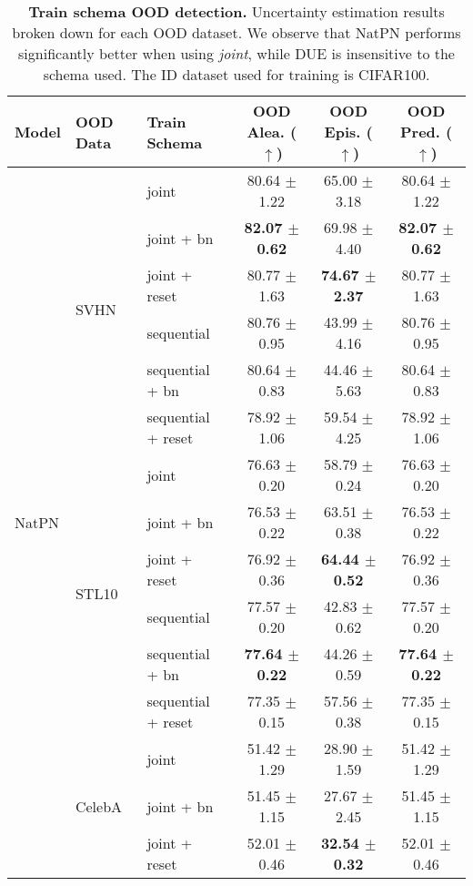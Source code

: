 \begin{table}[!htb]\centering
\caption{\textbf{Train schema OOD detection.} Uncertainty estimation results broken down for each OOD dataset. We observe that NatPN performs significantly better when using \textit{joint}, while DUE is insensitive to the schema used. The ID dataset used for training is CIFAR100.}
\label{tab:training_schema_ood}
\tiny

\begin{tabular}{lllccc}
\toprule
\textbf{Model} &\textbf{OOD Data} &\textbf{Train Schema} &\textbf{OOD Alea. ($\uparrow$)} &\textbf{OOD Epis. ($\uparrow$)} &\textbf{OOD Pred. ($\uparrow$)} \\
\midrule
\multirow{30}{*}{NatPN} &\multirow{6}{*}{SVHN} &joint &80.64 $\pm$ 1.22 &65.00 $\pm$ 3.18 &80.64 $\pm$ 1.22 \\
& &joint + bn &\textbf{82.07 $\pm$ 0.62} &69.98 $\pm$ 4.40 &\textbf{82.07 $\pm$ 0.62} \\
& &joint + reset &80.77 $\pm$ 1.63 &\textbf{74.67 $\pm$ 2.37} &80.77 $\pm$ 1.63 \\
& &sequential &80.76 $\pm$ 0.95 &43.99 $\pm$ 4.16 &80.76 $\pm$ 0.95 \\
& &sequential + bn &80.64 $\pm$ 0.83 &44.46 $\pm$ 5.63 &80.64 $\pm$ 0.83 \\
& &sequential + reset &78.92 $\pm$ 1.06 &59.54 $\pm$ 4.25 &78.92 $\pm$ 1.06 \\
\cmidrule[0.1pt](lr){2-6}
&\multirow{6}{*}{STL10} &joint &76.63 $\pm$ 0.20 &58.79 $\pm$ 0.24 &76.63 $\pm$ 0.20 \\
& &joint + bn &76.53 $\pm$ 0.22 &63.51 $\pm$ 0.38 &76.53 $\pm$ 0.22 \\
& &joint + reset &76.92 $\pm$ 0.36 &\textbf{64.44 $\pm$ 0.52} &76.92 $\pm$ 0.36 \\
& &sequential &77.57 $\pm$ 0.20 &42.83 $\pm$ 0.62 &77.57 $\pm$ 0.20 \\
& &sequential + bn &\textbf{77.64 $\pm$ 0.22} &44.26 $\pm$ 0.59 &\textbf{77.64 $\pm$ 0.22} \\
& &sequential + reset &77.35 $\pm$ 0.15 &57.56 $\pm$ 0.38 &77.35 $\pm$ 0.15 \\
\cmidrule[0.1pt](lr){2-6}
&\multirow{6}{*}{CelebA} &joint &51.42 $\pm$ 1.29 &28.90 $\pm$ 1.59 &51.42 $\pm$ 1.29 \\
& &joint + bn &51.45 $\pm$ 1.15 &27.67 $\pm$ 2.45 &51.45 $\pm$ 1.15 \\
& &joint + reset &52.01 $\pm$ 0.46 &\textbf{32.54 $\pm$ 0.32} &52.01 $\pm$ 0.46 \\

\end{tabular}
\end{table}
